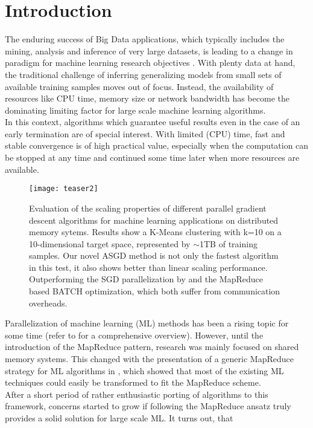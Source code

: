\documentclass{acm_proc_article-sp}
\begin{document}
\section{Introduction}
The enduring success of Big Data applications, which typically includes 
the mining, analysis and inference of very large datasets, is leading to a change 
in paradigm for machine learning research objectives \cite{bottou2008tradeoffs}. 
With plenty data at hand, the traditional challenge of inferring generalizing 
models from small sets of available training samples moves out of focus. Instead,
the availability of resources like CPU time, memory size or network bandwidth 
has become the dominating limiting factor for large scale machine learning
algorithms.\\
In this context, algorithms which guarantee useful results even in the case
of an early termination are of special interest. With limited (CPU) time,
fast and stable convergence is of high practical value, especially when the 
computation can be stopped at any time and continued some time later when more
resources are available.\\   
\begin{figure}[t]
\texttt{[image: teaser2]}
\caption{
Evaluation of the scaling properties of different parallel gradient
descent algorithms for machine learning applications on distributed memory sytems. 
Results show a  
K-Means clustering
with k=10 on a  10-dimensional target space, represented by $\sim$1TB 
of training 
samples. Our novel ASGD method is not only the fastest algorithm in this test,
it also shows better than linear scaling performance. Outperforming the 
SGD parallelization by \cite{SGDsmola} and 
the MapReduce based BATCH \cite{chu2007map} optimization,
which both suffer from communication overheads.  
}
\end{figure}
\noindent Parallelization of machine learning (ML) methods has been a 
rising topic for some time (refer to \cite{datamining} for a comprehensive
overview). However, until the introduction of the MapReduce pattern, 
research was mainly focused on shared memory systems. This changed with
the presentation of a generic MapReduce strategy for ML algorithms in
\cite{chu2007map}, which showed that most of the existing ML techniques
could easily be transformed to fit the MapReduce scheme.\\   
After a short period of rather enthusiastic porting of algorithms to this 
framework, concerns started to grow if following the MapReduce ansatz 
truly provides a solid solution for large scale ML. It turns out, that 
\end{document}
